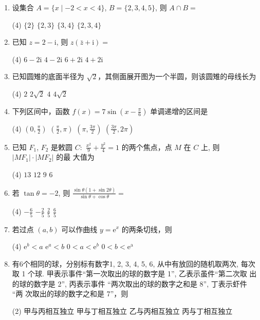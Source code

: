 \documentclass[11pt,space]{ctexart} %
\begin{document}
\begin{enumerate}[itemsep=0.3em,topsep=0pt]
	\item  设集合 $ A=\{x \mid-2<x<4\}$,  $B=\{2,3,4,5\} $, 则  $A \cap B=$
	\begin{tasks}(4)
	\task $\{2\} $ \task $\{2,3\}  $ \task $\{3,4\}  $ \task $ \{2,3,4\} $
	\end{tasks}
	
	\item  已知  $z=2-\mathrm{i} $, 则  $z(\bar{z}+\mathrm{i})=$
	\begin{tasks}(4)
	\task $6-2 \mathrm{i} $ \task $4-2 \mathrm{i} $ \task $6+2 \mathrm{i}  $ \task $ 4+2 \mathrm{i} $
	\end{tasks}
	
	\item  已知圆雉的底面半径为 $ \sqrt{2}  $，其侧面展开图为一个半圆，则该圆雉的母线长为
	\begin{tasks}(4)
	\task $ 2$ \task $ 2 \sqrt{2} $ \task $4 $ \task $4 \sqrt{2}  $
	\end{tasks}
	
	\item  下列区间中，函数  $f(x)=7 \sin \left(x-\frac{\pi}{6}\right)$  单调递增的区间是
	
	\begin{tasks}(4)
	\task $ \left(0, \frac{\pi}{2}\right) $ \task $\left(\frac{\pi}{2}, \pi\right) $ \task $ \left(\pi, \frac{3 \pi}{2}\right) $ \task $  \left(\frac{3 \pi}{2}, 2 \pi\right) $
	\end{tasks}

	\item  已知  $F_{1}$, $F_{2}$  是敕圆  $C:$ $\frac{x^{2}}{9}+\frac{y^{2}}{4}=1$  的两个焦点，点 $ M$  在  $C$  上, 则  $\left|M F_{1}\right| \cdot\left|M F_{2}\right|$  的最
	大值为

	\begin{tasks}(4)
	\task $ 13$ \task $ 12 $ \task $ 9$ \task $6 $
	\end{tasks}

	\item   若  $\tan \theta=-2 $, 则 $ \frac{\sin \theta(1+\sin 2 \theta)}{\sin \theta+\cos \theta}=$
	\begin{tasks}(4)
	\task $ -\frac{6}{5}$ \task $-\frac{2}{5} $ \task $\frac{2}{5}  $ \task $\frac{6}{5}  $
	\end{tasks}

	\item    若过点 $ (a, b) $ 可以作曲线 $ y=\mathrm{e}^{x} $ 的两条切线，则
	\begin{tasks}(4)
	\task $ \mathrm{e}^{b}<a$ \task $ \mathrm{e}^{a}<b $ \task $ 0<a<\mathrm{e}^{b}$ \task $ 0<b<\mathrm{e}^{\mathrm{a}} $
	\end{tasks}
	\item   有6个相同的球，分别标有数字1, 2, 3, 4, 5, 6, 从中有放回的随机取两次,
	每次取 1 个球. 甲表示事件“第一次取出的球的数字是 1”, 乙表示虽件“第二次取
	出的球的数字是 2”, 丙表示事件 “两次取出的球的数字之和是 8”, 丁表示虾件 “两
	次取出的球的数字之和是 7”，则
	\begin{tasks}(2)
	\task 甲与丙相互独立 \task 甲与丁相互独立 \task 乙与丙相互独立 \task 丙与丁相互独立
	\end{tasks}
	

\end{enumerate}
\end{document}
